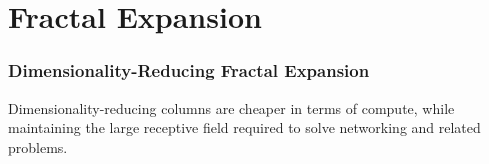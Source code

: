\documentclass[xcolor=dvipsnames]{beamer}
\begin{document}
\section{Fractal Expansion}
\begin{frame}
    \frametitle{Dimensionality-Reducing Fractal Expansion}
    Dimensionality-reducing columns are cheaper in terms of compute, while maintaining the large receptive field required to solve networking and related problems.
        \newcommand{\yscale}{3}
        \newcommand{\xscale}{1.5}
\end{frame}
\begin{frame}
\end{frame}
\end{document}
